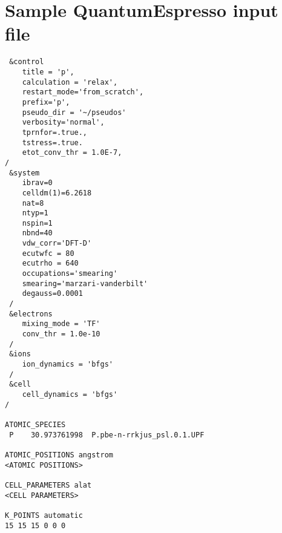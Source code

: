 \section{Sample {\sc QuantumEspresso} input file}
\begin{lstlisting}
 &control
    title = 'p',
    calculation = 'relax',
    restart_mode='from_scratch',
    prefix='p',
    pseudo_dir = '~/pseudos'
    verbosity='normal',
    tprnfor=.true.,
    tstress=.true.
    etot_conv_thr = 1.0E-7,  
/
 &system
    ibrav=0
    celldm(1)=6.2618
    nat=8
    ntyp=1
    nspin=1
    nbnd=40 
    vdw_corr='DFT-D'
    ecutwfc = 80
    ecutrho = 640
    occupations='smearing'
    smearing='marzari-vanderbilt'
    degauss=0.0001
 /
 &electrons
    mixing_mode = 'TF'
    conv_thr = 1.0e-10
 /
 &ions
    ion_dynamics = 'bfgs'
 /
 &cell
    cell_dynamics = 'bfgs'
/

ATOMIC_SPECIES
 P    30.973761998  P.pbe-n-rrkjus_psl.0.1.UPF

ATOMIC_POSITIONS angstrom
<ATOMIC POSITIONS>

CELL_PARAMETERS alat
<CELL PARAMETERS>

K_POINTS automatic
15 15 15 0 0 0
\end{lstlisting}
\newpage

